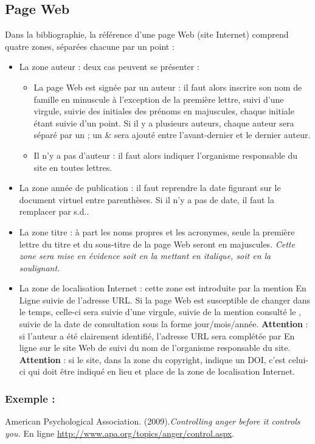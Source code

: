 \documentclass[a4paper,titlepage]{article}
\begin{document}
	\subsection*{Page Web}
Dans la bibliographie, la référence d’une page Web
(site Internet) comprend
quatre zones, séparées chacune par un point :
 \begin{itemize}
  \item La zone auteur : deux cas peuvent se présenter :
  \begin{itemize}
  	\item La page Web est signée par un auteur : il faut alors inscrire son nom de famille en minuscule à l’exception de la première lettre, suivi d’une virgule, suivie des initiales des prénoms en majuscules, chaque initiale étant suivie d’un point. Si il y a plusieurs auteurs, chaque auteur sera séparé par un ; un \& sera ajouté entre l’avant-dernier et le dernier auteur.
  	\item Il n’y a pas d’auteur : il faut alors indiquer l’organisme responsable du site en toutes lettres. 
  \end{itemize}
  \item La zone année de publication : il faut reprendre la date figurant sur le document virtuel entre parenthèses. Si il n’y a pas de date, il faut la remplacer par \og s.d.\fg{}. 
  \item La zone titre : à part les noms propres et les acronymes, seule la première lettre du titre et du sous-titre de la page Web seront en majuscules. \textit{Cette zone sera mise en évidence soit en la mettant en italique, soit en la soulignant.}
  \item La zone de localisation Internet : cette zone est introduite par la mention \og En Ligne \fg{}  suivie de l’adresse URL. Si la page Web est susceptible de changer dans le temps, celle-ci sera suivie d’une virgule, suivie de la mention \og consulté le \fg{}, suivie de la date de consultation sous la forme jour/mois/année. \textbf{Attention} : si l’auteur a été clairement identifié, l’adresse URL sera complétée par \og En ligne sur le site Web de \fg{} suivi du nom de l’organisme responsable du site. \textbf{Attention} : si le site, dans la zone du copyright, indique un DOI, c’est celui-ci qui doit être indiqué en lieu et place de la zone de localisation Internet. 
 \end{itemize}
 
\subsubsection*{Exemple :}
	American Psychological Association. (2009).\textit{Controlling anger before it controls you.} En ligne \url{http://www.apa.org/topics/anger/control.aspx}.\\
	
\end{document}
